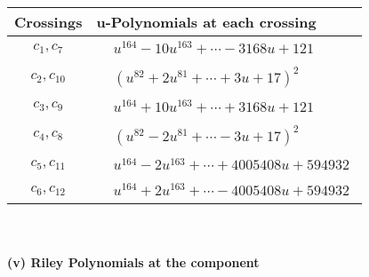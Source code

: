 \documentclass[1p]{elsarticle_modified}
\theoremstyle{definition}
\begin{document}
\begin{tabular}{m{50pt}|m{274pt}}
Crossings & \hspace{64pt}u-Polynomials at each crossing \\
\hline $$\begin{aligned}c_{1},c_{7}\end{aligned}$$&$\begin{aligned}
&u^{164}-10 u^{163}+\cdots-3168 u+121
\end{aligned}$\\
\hline $$\begin{aligned}c_{2},c_{10}\end{aligned}$$&$\begin{aligned}
&(u^{82}+2 u^{81}+\cdots+3 u+17)^{2}
\end{aligned}$\\
\hline $$\begin{aligned}c_{3},c_{9}\end{aligned}$$&$\begin{aligned}
&u^{164}+10 u^{163}+\cdots+3168 u+121
\end{aligned}$\\
\hline $$\begin{aligned}c_{4},c_{8}\end{aligned}$$&$\begin{aligned}
&(u^{82}-2 u^{81}+\cdots-3 u+17)^{2}
\end{aligned}$\\
\hline $$\begin{aligned}c_{5},c_{11}\end{aligned}$$&$\begin{aligned}
&u^{164}-2 u^{163}+\cdots+4005408 u+594932
\end{aligned}$\\
\hline $$\begin{aligned}c_{6},c_{12}\end{aligned}$$&$\begin{aligned}
&u^{164}+2 u^{163}+\cdots-4005408 u+594932
\end{aligned}$\\
\hline
\end{tabular}\\~\\
\newpage\renewcommand{\arraystretch}{1}
\flushleft \textbf{(v) Riley Polynomials at the component}\newline \\
\end{document}
